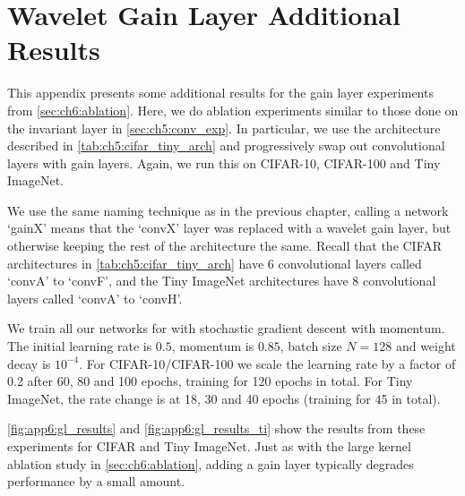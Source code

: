 \chapter{Wavelet Gain Layer Additional Results}\label{app:ch6:more_results}
\def \path {freqlearn/}
\def \imgpath {freqlearn/images}
This appendix presents some additional results for the gain layer experiments
from \autoref{sec:ch6:ablation}. Here, we do ablation experiments similar to
those done on the invariant layer in \autoref{sec:ch5:conv_exp}. In particular,
we use the architecture described in \autoref{tab:ch5:cifar_tiny_arch} and
progressively swap out convolutional layers with gain layers. 
Again, we run this on CIFAR-10, CIFAR-100 and Tiny ImageNet. 

We use the same naming technique as in the previous chapter, calling a network
`gainX' means that the `convX' layer was replaced with a wavelet gain layer, but
otherwise keeping the rest of the architecture the same. Recall that the
CIFAR architectures in \autoref{tab:ch5:cifar_tiny_arch} have 6 convolutional layers 
called `convA' to `convF', and the Tiny ImageNet architectures have 8
convolutional layers called `convA' to `convH'.

We train all our networks for with stochastic gradient descent with momentum.
The initial learning rate is $0.5$, momentum is $0.85$, batch size $N=128$ and
weight decay is $10^{-4}$. For CIFAR-10/CIFAR-100 we scale the learning rate by
a factor of 0.2 after 60, 80 and 100 epochs, training for 120 epochs in total.
For Tiny ImageNet, the rate change is at 18, 30 and 40 epochs (training for 45 in total).

\autoref{fig:app6:gl_results} and \autoref{fig:app6:gl_results_ti} show the results 
from these experiments for CIFAR and Tiny ImageNet. Just as with the large
kernel ablation study in \autoref{sec:ch6:ablation}, adding a gain layer
typically degrades performance by a small amount.

\begin{figure}[t]
  \centering
  \\
  \label{fig:app6:gl_results}
\end{figure}

